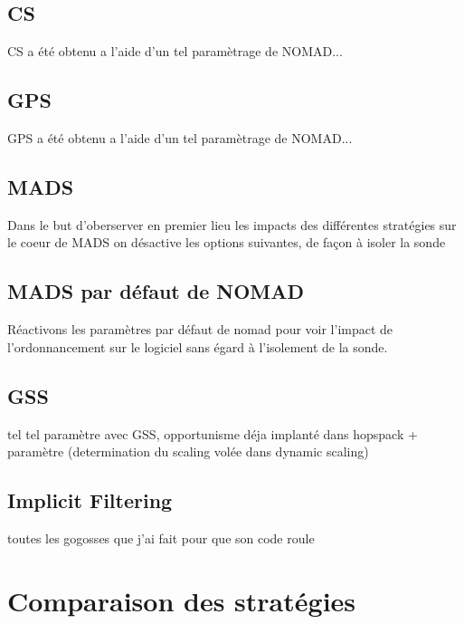 	\subsection{CS}
	CS a été obtenu a l'aide d'un tel paramètrage de NOMAD...
	\subsection{GPS}
	GPS a été obtenu a l'aide d'un tel paramètrage de NOMAD...
	\subsection{MADS}
	Dans le but d'oberserver en premier lieu les impacts des différentes stratégies sur le coeur de MADS on désactive les options suivantes, de façon à isoler la sonde
	\subsection{MADS par défaut de NOMAD}
	Réactivons les paramètres par défaut de nomad pour voir l'impact de l'ordonnancement sur le logiciel sans égard à l'isolement de la sonde.
	\subsection{GSS}
	tel tel paramètre avec GSS, opportunisme déja implanté dans hopspack + paramètre (determination du scaling volée dans dynamic scaling)
	\subsection{Implicit Filtering}
	toutes les gogosses que j'ai fait pour que son code roule
	\clearpage
\section{Comparaison des stratégies}
